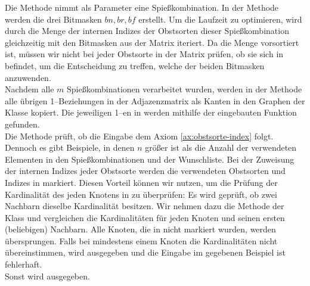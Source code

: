Die Methode  nimmt als Parameter eine Spießkombination. 
In der Methode werden die drei Bitmasken $bn, br, bf$ erstellt.
Um die Laufzeit zu optimieren, wird durch die Menge der internen Indizes der Obstsorten 
dieser Spießkombination  gleichzeitig mit den Bitmasken aus der Matrix iteriert.
Da die Menge  vorsortiert ist, müssen wir nicht bei jeder Obstsorte in der Matrix
prüfen, ob sie sich in  befindet, um die Entscheidung zu treffen, welche der beiden
Bitmasken anzuwenden.\\
Nachdem alle $m$ Spießkombinationen verarbeitet wurden, werden in der Methode 
alle übrigen 1--Beziehungen in der Adjazenzmatrix
als Kanten in den Graphen  der Klasse  kopiert. 
Die jeweiligen 1--en in  werden mithilfe der eingebauten Funktion 
gefunden.\\

Die Methode  prüft, ob die Eingabe dem Axiom \ref{ax:obstsorte-index} folgt.
Dennoch es gibt Beispiele, in denen $n$ größer ist als die Anzahl der verwendeten Elementen in den
Spießkombinationen und der Wunschliste.
Bei der Zuweisung der internen Indizes jeder Obstsorte werden die verwendeten Obstsorten und Indizes
in  markiert. Diesen Vorteil können wir nutzen, um die Prüfung der Kardinalität des
jeden Knotens in  zu überprüfen: Es wird geprüft, ob zwei Nachbarn dieselbe Kardinalität besitzen.
Wir nehmen dazu die Methode  der Klass  und vergleichen die
Kardinalitäten für jeden Knoten und seinen ersten (beliebigen) Nachbarn. 
Alle Knoten, die in  nicht markiert wurden, werden übersprungen.
Falls bei mindestens einem Knoten die Kardinalitäten nicht übereinstimmen, wird  ausgegeben und
die Eingabe im gegebenen Beispiel ist fehlerhaft.\\
Sonst wird  ausgegeben.\\ 

